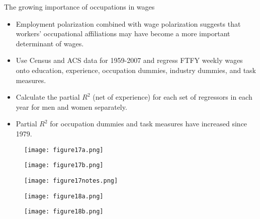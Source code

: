 \documentclass[notes=show]{beamer}
\begin{document}
\begin{frame}{The growing importance of occupations in wages}
\begin{itemize}
\item Employment polarization combined with wage polarization suggests that workers' occupational affiliations may have become a more important determinant of wages. \medskip
\item Use Census and ACS data for 1959-2007 and regress FTFY weekly wages onto education, experience, occupation dummies, industry dummies, and task measures. \medskip
\item Calculate the partial $R^2$ (net of experience) for each set of regressors in each year for men and women separately. \medskip
\item Partial $R^2$ for occupation dummies and task measures have increased since 1979.
\end{itemize}
\end{frame}

\newpage
\begin{center}
\begin{figure}
\texttt{[image: figure17a.png]}
\end{figure} 
\end{center}
\newpage

\newpage
\begin{center}
\begin{figure}
\texttt{[image: figure17b.png]}
\end{figure} 
\end{center}
\newpage

\newpage
\begin{center}
\begin{figure}
\texttt{[image: figure17notes.png]}
\end{figure} 
\end{center}
\newpage

\newpage
\begin{center}
\begin{figure}
\texttt{[image: figure18a.png]}
\end{figure} 
\end{center}
\newpage

\newpage
\begin{center}
\begin{figure}
\texttt{[image: figure18b.png]}
\end{figure} 
\end{center}
\newpage
\end{document}
